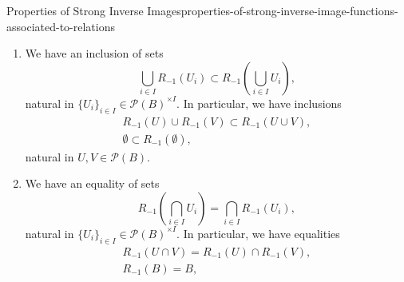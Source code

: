 \begin{proposition}{Properties of Strong Inverse Images}{properties-of-strong-inverse-image-functions-associated-to-relations}
\begin{enumerate}
\begin{webcompile}
            \end{webcompile}
            witnessed by a bijections of sets
            \[%
                \Hom_{\mathcal{P}(A)}(R_{!}(U),V)%
                \cong%
                \Hom_{\mathcal{P}(A)}(U,R_{-1}(V)),%
            \]%
            natural in $U\in\mathcal{P}(A)$ and $V\in\mathcal{P}(B)$, i.e.\ such that:
            \begin{itemize}
                \itemstar The following conditions are equivalent:
                    \begin{itemize}
                        \item We have $R_{!}(U)\subset V$.
                        \item We have $U\subset R_{-1}(V)$.
                    \end{itemize}
            \end{itemize}
        \item\label{properties-of-strong-inverse-image-functions-associated-to-relations-lax-preservation-of-colimits}We have an inclusion of sets
            \[
                \bigcup_{i\in I}R_{-1}(U_{i})%
                \subset%
                R_{-1}(\bigcup_{i\in I}U_{i}),%
            \]%
            natural in $\{U_{i}\}_{i\in I}\in\mathcal{P}(B)^{\times I}$. In particular, we have inclusions%
            \[
                \begin{gathered}
                    R_{-1}(U)\cup R_{-1}(V) \subset R_{-1}(U\cup V),\\
                    \emptyset               \subset R_{-1}(\emptyset),
                \end{gathered}
            \]%
            natural in $U,V\in\mathcal{P}(B)$.
        \item\label{properties-of-strong-inverse-image-functions-associated-to-relations-preservation-of-limits}We have an equality of sets
            \[
                    R_{-1}(\bigcap_{i\in I}U_{i})%
                    =%
                    \bigcap_{i\in I}R_{-1}(U_{i}),%
            \]%
            natural in $\{U_{i}\}_{i\in I}\in\mathcal{P}(B)^{\times I}$. In particular, we have equalities%
            \[
                \begin{gathered}
                    R_{-1}(U\cap V) = R_{-1}(U)\cap R_{-1}(V),\\
                    R_{-1}(B)       = B,
                \end{gathered}
            \]%

\end{enumerate}
\end{proposition}
